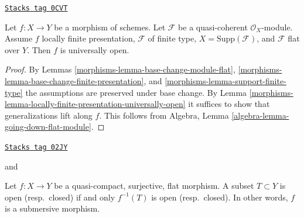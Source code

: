 \begin{lemma}
\label{morphisms-lemma-pf-flat-module-open}
\href{https://stacks.math.columbia.edu/tag/0CVT}{\texttt{Stacks tag 0CVT}}

Let $f : X \to Y$ be a morphism of schemes.
Let $\mathcal{F}$ be a quasi-coherent $\mathcal{O}_X$-module.
Assume $f$ locally finite presentation, $\mathcal{F}$ of
finite type, $X = \text{Supp}(\mathcal{F})$, and
$\mathcal{F}$ flat over $Y$. Then $f$ is universally open.
\end{lemma}

\begin{proof}

By Lemmas \ref{morphisms-lemma-base-change-module-flat},
\ref{morphisms-lemma-base-change-finite-presentation}, and
\ref{morphisms-lemma-support-finite-type}
the assumptions are preserved under base change.
By Lemma \ref{morphisms-lemma-locally-finite-presentation-universally-open}
it suffices to show that generalizations lift along $f$.
This follows from Algebra, Lemma \ref{algebra-lemma-going-down-flat-module}.
\end{proof}

\begin{lemma}
\label{morphisms-lemma-fpqc-quotient-topology}
\href{https://stacks.math.columbia.edu/tag/02JY}{\texttt{Stacks tag 02JY}}

\begin{reference}
\cite[Expose VIII, Corollaire 4.3]{SGA1} and
\cite[IV, Corollaire 2.3.12]{EGA}
\end{reference}
Let $f : X \to Y$ be a quasi-compact, surjective, flat morphism.
A subset $T \subset Y$ is open (resp.\ closed) if and only
$f^{-1}(T)$ is open (resp.\ closed). In other words, $f$ is
a submersive morphism.
\end{lemma}

